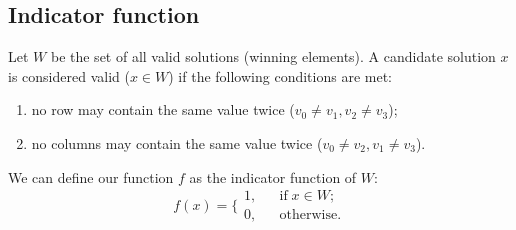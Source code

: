 \documentclass{article}
\begin{document}
\subsection{Indicator function}
Let $W$ be the set of all valid
solutions (winning elements).
A candidate solution $x$ is considered valid ($x \in W$) if
the following conditions are met:
\begin{enumerate}
  \item
  no row may contain the same value twice ($v_0 \neq v_1, v_2 \neq v_3$);
  \item
  no columns may contain the same value twice ($v_0 \neq v_2, v_1 \neq v_3$).
\end{enumerate}
We can define our function $f$ as the indicator function of $W$:
\[
  f(x) = \bigg\{
  \begin{aligned}
    1, && \text{if} \; x \in W; \\
    0, && \text{otherwise}.
  \end{aligned}
\]
\end{document}
